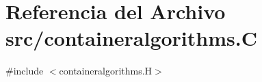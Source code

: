 \hypertarget{containeralgorithms_8_c}{}\section{Referencia del Archivo src/containeralgorithms.C}
\label{containeralgorithms_8_c}
{\ttfamily \#include $<$containeralgorithms.\+H$>$}\newline
